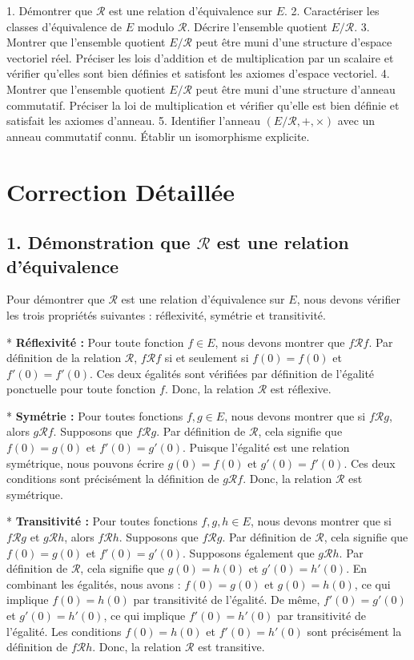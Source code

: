 \documentclass{report}
\begin{document}
1.  Démontrer que $\mathcal{R}$ est une relation d'équivalence sur $E$.
2.  Caractériser les classes d'équivalence de $E$ modulo $\mathcal{R}$. Décrire l'ensemble quotient $E/\mathcal{R}$.
3.  Montrer que l'ensemble quotient $E/\mathcal{R}$ peut être muni d'une structure d'espace vectoriel réel. Préciser les lois d'addition et de multiplication par un scalaire et vérifier qu'elles sont bien définies et satisfont les axiomes d'espace vectoriel.
4.  Montrer que l'ensemble quotient $E/\mathcal{R}$ peut être muni d'une structure d'anneau commutatif. Préciser la loi de multiplication et vérifier qu'elle est bien définie et satisfait les axiomes d'anneau.
5.  Identifier l'anneau $(E/\mathcal{R}, +, \times)$ avec un anneau commutatif connu. Établir un isomorphisme explicite.

\section*{Correction Détaillée}

\subsection*{1. Démonstration que $\mathcal{R}$ est une relation d'équivalence}

Pour démontrer que $\mathcal{R}$ est une relation d'équivalence sur $E$, nous devons vérifier les trois propriétés suivantes : réflexivité, symétrie et transitivité.

*   \textbf{Réflexivité :} Pour toute fonction $f \in E$, nous devons montrer que $f \mathcal{R} f$.
    Par définition de la relation $\mathcal{R}$, $f \mathcal{R} f$ si et seulement si $f(0) = f(0)$ et $f'(0) = f'(0)$.
    Ces deux égalités sont vérifiées par définition de l'égalité ponctuelle pour toute fonction $f$.
    Donc, la relation $\mathcal{R}$ est réflexive.

*   \textbf{Symétrie :} Pour toutes fonctions $f, g \in E$, nous devons montrer que si $f \mathcal{R} g$, alors $g \mathcal{R} f$.
    Supposons que $f \mathcal{R} g$. Par définition de $\mathcal{R}$, cela signifie que $f(0) = g(0)$ et $f'(0) = g'(0)$.
    Puisque l'égalité est une relation symétrique, nous pouvons écrire $g(0) = f(0)$ et $g'(0) = f'(0)$.
    Ces deux conditions sont précisément la définition de $g \mathcal{R} f$.
    Donc, la relation $\mathcal{R}$ est symétrique.

*   \textbf{Transitivité :} Pour toutes fonctions $f, g, h \in E$, nous devons montrer que si $f \mathcal{R} g$ et $g \mathcal{R} h$, alors $f \mathcal{R} h$.
    Supposons que $f \mathcal{R} g$. Par définition de $\mathcal{R}$, cela signifie que $f(0) = g(0)$ et $f'(0) = g'(0)$.
    Supposons également que $g \mathcal{R} h$. Par définition de $\mathcal{R}$, cela signifie que $g(0) = h(0)$ et $g'(0) = h'(0)$.
    En combinant les égalités, nous avons :
    $f(0) = g(0)$ et $g(0) = h(0)$, ce qui implique $f(0) = h(0)$ par transitivité de l'égalité.
    De même, $f'(0) = g'(0)$ et $g'(0) = h'(0)$, ce qui implique $f'(0) = h'(0)$ par transitivité de l'égalité.
    Les conditions $f(0) = h(0)$ et $f'(0) = h'(0)$ sont précisément la définition de $f \mathcal{R} h$.
    Donc, la relation $\mathcal{R}$ est transitive.
\end{document}
